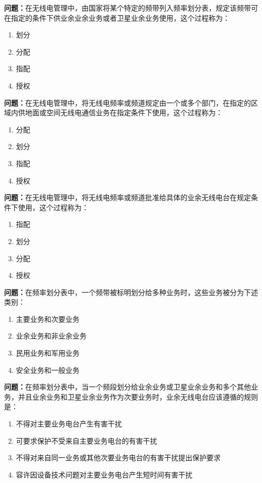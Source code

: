 \documentclass{ctexbook}
\begin{document}
\textbf{问题：}在无线电管理中，由国家将某个特定的频带列入频率划分表，规定该频带可在指定的条件下供业余业余业务或者卫星业余业务使用，这个过程称为：
\begin{enumerate}[label=\Alph*), leftmargin=3em]
\item 划分
\item 分配
\item 指配
\item 授权
\end{enumerate}

\textbf{问题：}在无线电管理中，将无线电频率或频道规定由一个或多个部门，在指定的区域内供地面或空间无线电通信业务在指定条件下使用，这个过程称为：
\begin{enumerate}[label=\Alph*), leftmargin=3em]
\item 分配
\item 划分
\item 指配
\item 授权
\end{enumerate}

\textbf{问题：}在无线电管理中，将无线电频率或频道批准给具体的业余无线电台在规定条件下使用，这个过程称为：
\begin{enumerate}[label=\Alph*), leftmargin=3em]
\item 指配
\item 划分
\item 分配
\item 授权
\end{enumerate}

\textbf{问题：}在频率划分表中，一个频带被标明划分给多种业务时，这些业务被分为下述类别：
\begin{enumerate}[label=\Alph*), leftmargin=3em]
\item 主要业务和次要业务
\item 业余业务和非业余业务
\item 民用业务和军用业务
\item 安全业务和一般业务
\end{enumerate}

\textbf{问题：}在频率划分表中，当一个频段划分给业余业务或卫星业余业务和多个其他业务，并且业余业务和卫星业余业务作为次要业务时，业余无线电台应该遵循的规则是：
\begin{enumerate}[label=\Alph*), leftmargin=3em]
\item 不得对主要业务电台产生有害干扰
\item 可要求保护不受来自主要业务电台的有害干扰
\item 不得对来自同一业务或其他次要业务电台的有害干扰提出保护要求
\item 容许因设备技术问题对主要业务电台产生短时间有害干扰
\end{enumerate}
\end{document}
